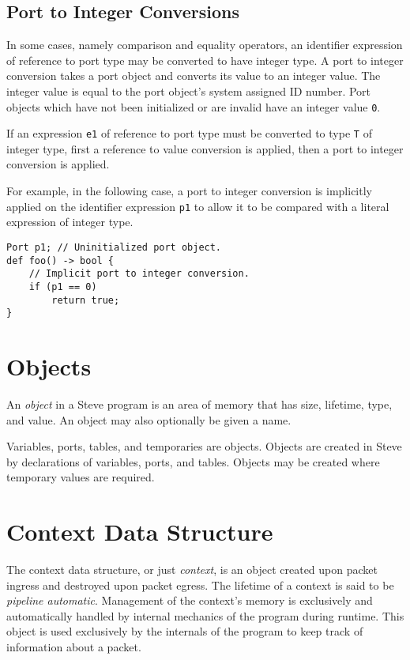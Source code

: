 \subsection{Port to Integer Conversions} \label{port_conv}

In some cases, namely comparison and equality operators, an identifier expression of reference to port type may be converted to have integer type. A port to integer conversion takes a port object and converts its value to an integer value. The integer value is equal to the port object's system assigned ID number. Port objects which have not been initialized or are invalid have an integer value \texttt{0}.

If an expression \texttt{e1} of reference to port type must be converted to type \texttt{T} of integer type, first a reference to value conversion is applied, then a port to integer conversion is applied.

For example, in the following case, a port to integer conversion is implicitly applied on the identifier expression \texttt{p1} to allow it to be compared with a literal expression of integer type.

\noindent\begin{minipage}{\linewidth}
\begin{lstlisting}
Port p1; // Uninitialized port object.
def foo() -> bool {
	// Implicit port to integer conversion.
	if (p1 == 0)
		return true;
}
\end{lstlisting}
\end{minipage}

\section{Objects} \label{object_guide}

An \textit{object} in a Steve program is an area of memory that has size, lifetime, type, and value. An object may also optionally be given a name.

Variables, ports, tables, and temporaries are objects. Objects are created in Steve by declarations of variables, ports, and tables. Objects may be created where temporary values are required.

\section{Context Data Structure} \label{context_guide}

The context data structure, or just \textit{context}, is an object created upon packet ingress and destroyed upon packet egress. The lifetime of a context is said to be \textit{pipeline automatic}. Management of the context's memory is exclusively and automatically handled by internal mechanics of the program during runtime. This object is used exclusively by the internals of the program to keep track of information about a packet. 

